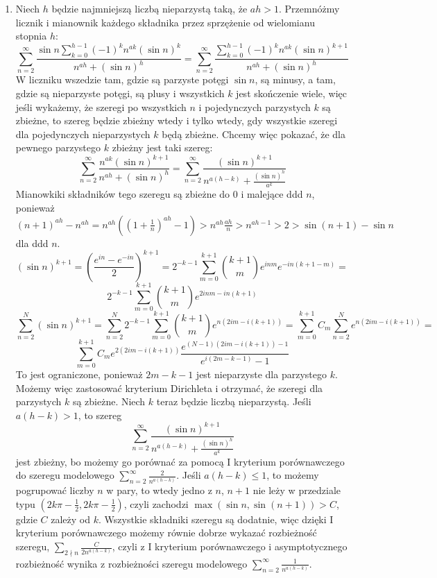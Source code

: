 \documentclass{../note}
\begin{document}
\begin{rozwiazanie}
\begin{enumerate}[label=(\alph*)]
    Używając ponownie I kryterium porównawczego dostajemy, że powyższy szereg jest zbieżny, ponieważ szereg modelowy $\sum_{m=m_0}^{\infty} \frac{1}{m^2}$ jest zbieżny. Możemy więc zsumować te szeregi po $k \in \{0, 1, 2\}$ i otrzymujemy, że zbieżny jest szereg $ \sum_{n=2}^{\infty}(-1)^{\lfloor \frac13n\rfloor}\frac{1}{n-\ln n} $. Jest on bezwzględnie rozbieżny, ponieważ z I kryterium porównawczego możemy go porównać do $\sum_{n=2}^{\infty} \frac{1}{2n}$.
    \item Niech $h$ będzie najmniejszą liczbą nieparzystą taką, że $ah > 1$. Przemnóżmy licznik i mianownik każdego składnika przez sprzężenie od wielomianu stopnia $h$:
    \[\sum_{n=2}^{\infty}\frac{\sin n\sum_{k=0}^{h-1}(-1)^kn^{ak}(\sin n)^k}{n^{ah}+(\sin n)^h} = \sum_{n=2}^{\infty}\frac{\sum_{k=0}^{h-1}(-1)^kn^{ak}(\sin n)^{k+1}}{n^{ah}+(\sin n)^h}\]
    W liczniku wszedzie tam, gdzie są parzyste potęgi $\sin n$, są minusy, a tam, gdzie są nieparzyste potęgi, są plusy i wszystkich $k$ jest skończenie wiele, więc jeśli wykażemy, że szeregi po wszystkich $n$ i pojedynczych parzystych $k$ są zbieżne, to szereg będzie zbieżny wtedy i tylko wtedy, gdy wszystkie szeregi dla pojedynczych nieparzystych $k$ będą zbieżne. Chcemy więc pokazać, że dla pewnego parzystego $k$ zbieżny jest taki szereg:
    \[\sum_{n=2}^{\infty}\frac{n^{ak}(\sin n)^{k+1}}{n^{ah}+(\sin n)^h} = \sum_{n=2}^{\infty}\frac{(\sin n)^{k+1}}{n^{a(h-k)}+\frac{(\sin n)^h}{a^k}}\]
    Mianowkiki składników tego szeregu są zbieżne do 0 i malejące ddd $n$, ponieważ $(n+1)^{ah} - n^{ah} = n^{ah}\left(\left(1 + \frac1n\right)^{ah} - 1\right) > n^{ah}\frac{ah}{n} > n^{ah-1} > 2 > \sin(n+1) - \sin n$ dla ddd $n$.
    \[(\sin n)^{k+1} = \left(\frac{e^{in} - e^{-in}}{2}\right)^{k+1} = 2^{-k-1}\sum_{m=0}^{k+1} \binom{k+1}{m} e^{inm}e^{-in(k+1-m)} =\]\[ 2^{-k-1}\sum_{m=0}^{k+1} \binom{k+1}{m} e^{2inm-in(k+1)}\]
    \[\sum_{n=2}^{N} (\sin n)^{k+1} = \sum_{n=2}^{N} 2^{-k-1}\sum_{m=0}^{k+1} \binom{k+1}{m} e^{n(2im-i(k+1))}= \sum_{m=0}^{k+1} C_m \sum_{n=2}^{N} e^{n(2im-i(k+1))} =\]
    \[\sum_{m=0}^{k+1} C_m e^{2(2im-i(k+1))}\frac{e^{(N-1)(2im-i(k+1)) - 1}}{e^{i(2m-k-1)} - 1}\]
    To jest ograniczone, ponieważ $2m-k-1$ jest nieparzyste dla parzystego $k$. Możemy więc zastosować kryterium Dirichleta i otrzymać, że szeregi dla parzystych $k$ są zbieżne. Niech $k$ teraz będzie liczbą nieparzystą. Jeśli $a(h-k)>1$, to szereg 
    \[\sum_{n=2}^{\infty}\frac{(\sin n)^{k+1}}{n^{a(h-k)}+\frac{(\sin n)^h}{a^k}}\]
    jest zbieżny, bo możemy go porównać za pomocą I kryterium porównawczego do szeregu modelowego $\sum_{n=2}^{\infty} \frac{2}{n^{a(h-k)}}$. Jeśli $a(h-k)\leq1$, to możemy pogrupować liczby $n$ w pary, to wtedy jedno z $n$, $n+1$ nie leży w przedziale typu $(2k\pi - \frac12, 2k\pi - \frac12)$, czyli zachodzi $\max(\sin n, \sin(n+1)) > C$, gdzie $C$ zależy od $k$. Wszystkie składniki szeregu są dodatnie, więc dzięki I kryterium porównawczego możemy równie dobrze wykazać rozbieżność szeregu, $\sum_{2 \nmid n}\frac{C}{2n^{a(h-k)}}$, czyli z I kryterium porównawczego i asymptotycznego rozbieżność wynika z rozbieżności szeregu modelowego $\sum_{n=2}^{\infty}\frac{1}{n^{a(h-k)}}$.\\

\end{enumerate}
\end{rozwiazanie}
\end{document}
